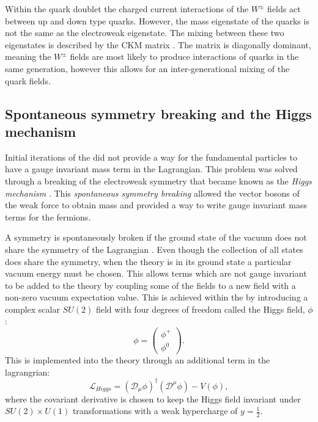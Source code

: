Within the quark doublet the charged current interactions of the
$W^{\pm}$ fields act between up and down type quarks. However, the
mass eigenstate of the quarks is not the same as the electroweak
eigenstate. The mixing between these two eigenstates is described by
the \ac{CKM} matrix \cite{Kobayashi:1973fv}. The matrix is diagonally
dominant, meaning the $W^{\pm}$ fields are most likely to produce
interactions of quarks in the same generation, however this allows for
an inter-generational mixing of the quark fields.

\subsection{Spontaneous symmetry breaking and the Higgs mechanism}

Initial iterations of the \SM did not provide a way for the
fundamental particles to have a gauge invariant mass term in the
Lagrangian. This problem was solved through a breaking of
the electroweak symmetry that became known as the \emph{Higgs
mechanism}
\cite{Englert:1964et,Higgs:1964ia,Higgs:1964pj,Guralnik:1964eu,Higgs:1966ev,Kibble:1967sv}.
This \emph{spontaneous symmetry breaking} allowed the vector bosons of the
weak force to obtain mass and provided a way to write gauge invariant
mass terms for the fermions.

A symmetry is spontaneously broken if the ground state of
the vacuum does not share the symmetry of the Lagrangian
\cite{Griffiths:111880}. Even though the collection of all states does
share the symmetry, when the theory is in its ground state a
particular vacuum energy must be chosen. This allows terms which are
not gauge invariant to be added to the theory by coupling some of the
fields to a new field with a non-zero vacuum expectation value. This
is achieved within the \SM by introducing a complex scalar $SU(2)$
field with four degrees of freedom called the Higgs field, $\phi$:
\begin{equation}
\phi=\left(\begin{array}{c}\phi^+ \\ \phi^0 \end{array}\right).
\end{equation}
This is implemented into the theory through an additional term in the
\SM lagrangrian:
\begin{equation}
\mathcal{L}_{Higgs} =
(\mathcal{D}_{\mu}\phi)^{\dag}(\mathcal{D}^{\mu}\phi) - V(\phi),
\end{equation}
where the covariant derivative is chosen to keep the Higgs field
invariant under $SU(2)\times U(1)$ transformations with a weak
hypercharge of $y=\frac{1}{2}$.

